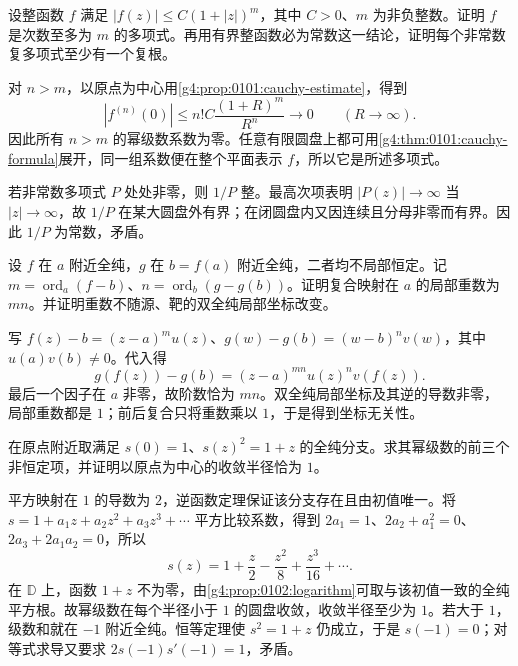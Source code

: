 \begin{exercise}
	\label{g4:ex:0101:polynomial-growth}
	设整函数 \(f\) 满足 \(|f(z)|\le C(1+|z|)^m\)，其中 \(C>0\)、\(m\) 为非负整数。证明 \(f\) 是次数至多为 \(m\) 的多项式。再用有界整函数必为常数这一结论，证明每个非常数复多项式至少有一个复根。
\end{exercise}
\begin{solution}
	对 \(n>m\)，以原点为中心用\cref{g4:prop:0101:cauchy-estimate}，得到
	\[
		|f^{(n)}(0)|\le n!C\frac{(1+R)^m}{R^n}\longrightarrow0\qquad(R\to\infty).
	\]
	因此所有 \(n>m\) 的幂级数系数为零。任意有限圆盘上都可用\cref{g4:thm:0101:cauchy-formula}展开，同一组系数便在整个平面表示 \(f\)，所以它是所述多项式。

	若非常数多项式 \(P\) 处处非零，则 \(1/P\) 整。最高次项表明 \(|P(z)|\to\infty\) 当 \(|z|\to\infty\)，故 \(1/P\) 在某大圆盘外有界；在闭圆盘内又因连续且分母非零而有界。因此 \(1/P\) 为常数，矛盾。
\end{solution}

\begin{exercise}
	\label{g4:ex:0101:composition-order}
	设 \(f\) 在 \(a\) 附近全纯，\(g\) 在 \(b=f(a)\) 附近全纯，二者均不局部恒定。记 \(m=\operatorname{ord}_a(f-b)\)、\(n=\operatorname{ord}_b(g-g(b))\)。证明复合映射在 \(a\) 的局部重数为 \(mn\)。并证明重数不随源、靶的双全纯局部坐标改变。
\end{exercise}
\begin{solution}
	写 \(f(z)-b=(z-a)^m u(z)\)、\(g(w)-g(b)=(w-b)^n v(w)\)，其中 \(u(a)v(b)\ne0\)。代入得
	\[
		g(f(z))-g(b)=(z-a)^{mn}u(z)^n v(f(z)).
	\]
	最后一个因子在 \(a\) 非零，故阶数恰为 \(mn\)。双全纯局部坐标及其逆的导数非零，局部重数都是 \(1\)；前后复合只将重数乘以 \(1\)，于是得到坐标无关性。
\end{solution}

\begin{exercise}
	\label{g4:ex:0101:local-root-radius}
	在原点附近取满足 \(s(0)=1\)、\(s(z)^2=1+z\) 的全纯分支。求其幂级数的前三个非恒定项，并证明以原点为中心的收敛半径恰为 \(1\)。
\end{exercise}
\begin{solution}
	平方映射在 \(1\) 的导数为 \(2\)，逆函数定理保证该分支存在且由初值唯一。将 \(s=1+a_1z+a_2z^2+a_3z^3+\cdots\) 平方比较系数，得到 \(2a_1=1\)、\(2a_2+a_1^2=0\)、\(2a_3+2a_1a_2=0\)，所以
	\[
		s(z)=1+\frac z2-\frac{z^2}8+\frac{z^3}{16}+\cdots.
	\]
	在 \(\mathbb D\) 上，函数 \(1+z\) 不为零，由\cref{g4:prop:0102:logarithm}可取与该初值一致的全纯平方根。故幂级数在每个半径小于 \(1\) 的圆盘收敛，收敛半径至少为 \(1\)。若大于 \(1\)，级数和就在 \(-1\) 附近全纯。恒等定理使 \(s^2=1+z\) 仍成立，于是 \(s(-1)=0\)；对等式求导又要求 \(2s(-1)s'(-1)=1\)，矛盾。
\end{solution}

